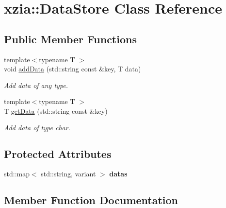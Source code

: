 \hypertarget{classxzia_1_1DataStore}{}\section{xzia\+:\+:Data\+Store Class Reference}
\label{classxzia_1_1DataStore}
\subsection*{Public Member Functions}
\begin{DoxyCompactItemize}
\item 
{\footnotesize template$<$typename T $>$ }\\void \mbox{\hyperlink{classxzia_1_1DataStore_a97301fd6dfa58a88b9903fb7fdf307a1}{add\+Data}} (std\+::string const \&key, T data)
\begin{DoxyCompactList}\small\item\em Add data of any type. \end{DoxyCompactList}\item 
{\footnotesize template$<$typename T $>$ }\\T \mbox{\hyperlink{classxzia_1_1DataStore_a91fb035bfe2bebe2e21a0cf5aaad5a04}{get\+Data}} (std\+::string const \&key)
\begin{DoxyCompactList}\small\item\em Add data of type char. \end{DoxyCompactList}\end{DoxyCompactItemize}
\subsection*{Protected Attributes}
\begin{DoxyCompactItemize}
\item 
\mbox{\label{classxzia_1_1DataStore_a3bbea48eb0a1432158a016315c3d1557}} 
std\+::map$<$ std\+::string, variant $>$ {\bfseries datas}
\end{DoxyCompactItemize}


\subsection{Member Function Documentation}
\mbox{\label{classxzia_1_1DataStore_a97301fd6dfa58a88b9903fb7fdf307a1}} 
